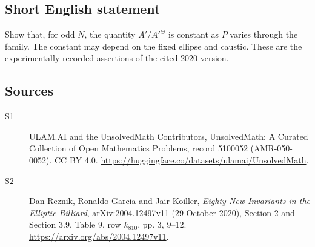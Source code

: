 \documentclass[11pt]{article}
\begin{document}
\subsection{Short English statement}
Show that, for odd $N$, the quantity $A'/{A'}^\ominus$ is constant as $P$ varies through the family. The constant may depend on the fixed ellipse and caustic. These are the experimentally recorded assertions of the cited 2020 version.
\subsection{Sources}
\begin{description}
\item[\hypertarget{source:5100052:1}{S1}] ULAM.AI and the UnsolvedMath Contributors, UnsolvedMath: A Curated Collection of Open Mathematics Problems, record 5100052 (AMR-050-0052). CC BY 4.0. \url{https://huggingface.co/datasets/ulamai/UnsolvedMath}.
\item[\hypertarget{source:5100052:2}{S2}] Dan Reznik, Ronaldo Garcia and Jair Koiller, \emph{Eighty New Invariants in the Elliptic Billiard}, arXiv:2004.12497v11 (29 October 2020), Section 2 and Section 3.9, Table 9, row $k_{810}$, pp. 3, 9--12. \url{https://arxiv.org/abs/2004.12497v11}.
\end{description}
\label{end:5100052}
\end{document}
